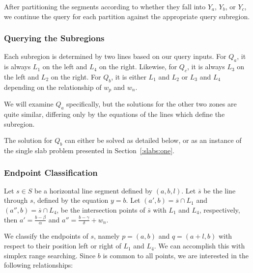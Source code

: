 After partitioning the segments according to whether they fall into $Y_a$, $Y_b$, or $Y_c$, we continue the query for each partition against the appropriate query subregion.


\subsubsection{Querying the Subregions}

Each subregion is determined by two lines based on our query inputs. For $Q_a$, it is always $L_1$ on the left and $L_4$ on the right. Likewise, for $Q_c$, it is always $L_3$ on the left and $L_2$ on the right. For $Q_b$, it is either $L_1$ and $L_2$ or $L_3$ and $L_4$ depending on the relationship of $w_p$ and $w_n$.

We will examine $Q_a$ specifically, but the solutions for the other two zones are quite similar, differing only by the equations of the lines which define the subregion.

The solution for $Q_b$ can either be solved as detailed below, or as an instance of the single slab problem presented in Section~\ref{:slabs:one}.


\subsubsection{Endpoint Classification}

Let $s \in S$ be a horizontal line segment defined by $(a, b, l)$.  Let $\overline{s}$ be the line through $s$, defined by the equation $y = b$.  Let $(a', b) = \overline{s} \cap L_1$ and $(a'', b) = \overline{s} \cap L_4$, be the intersection points of $\overline{s}$ with $L_1$ and $L_4$, respectively, then $a' = \frac{b - \beta}{\alpha}$ and $a'' = \frac{b - \gamma}{\delta} + w_n$.

We classify the endpoints of $s$, namely $p = (a, b)$ and $q = (a + l, b)$ with respect to their position left or right of $L_1$ and $L_4$. We can accomplish this with simplex range searching. Since $b$ is common to all points, we are interested in the following relationships:

